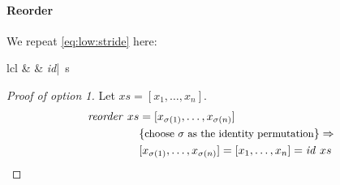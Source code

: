 \paragraph{Reorder}

We repeat \autoref{eq:low:stride} here:
\begin{rerule*}{lcl}
  \reorder & \rightarrow & \textit{id}\quad |\quad \reorderStride\ s
\end{rerule*}

\begin{proof}[Proof of option 1]
  Let $xs = [x_1, \ldots, x_n]$.
  \begin{align*}
    \text{\textit{reorder}}\ xs &= [x_{\sigma(1)}, \ldots, x_{\sigma(n)}]\\
                 &\{\text{\small choose $\sigma$ as the identity permutation}\} \Rightarrow\\
                 & [x_{\sigma(1)}, \ldots, x_{\sigma(n)}] = [x_1, \ldots, x_n] = \text{\textit{id}}\ xs
  \end{align*}
\end{proof}

